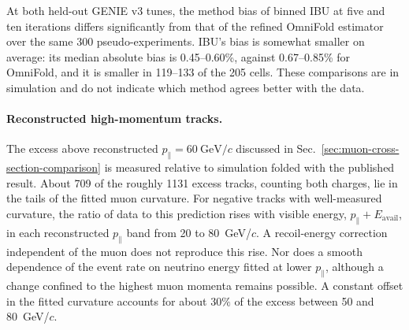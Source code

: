 At both held-out GENIE v3 tunes, the method bias of binned IBU at five and ten iterations differs significantly from that of the refined OmniFold estimator over the same 300 pseudo-experiments. IBU's bias is somewhat smaller on average: its median absolute bias is 0.45--0.60\%, against 0.67--0.85\% for OmniFold, and it is smaller in 119--133 of the 205 cells. These comparisons are in simulation and do not indicate which method agrees better with the data.

\paragraph{Reconstructed high-momentum tracks.}\label{app:high-pz-tracks} The excess above reconstructed $p_\parallel = 60~\mathrm{GeV}/c$ discussed in Sec.~\ref{sec:muon-cross-section-comparison} is measured relative to simulation folded with the published result. About 709 of the roughly 1131 excess tracks, counting both charges, lie in the tails of the fitted muon curvature. For negative tracks with well-measured curvature, the ratio of data to this prediction rises with visible energy, $p_\parallel + E_{\mathrm{avail}}$, in each reconstructed $p_\parallel$ band from 20 to 80~GeV/$c$. A recoil-energy correction independent of the muon does not reproduce this rise. Nor does a smooth dependence of the event rate on neutrino energy fitted at lower $p_\parallel$, although a change confined to the highest muon momenta remains possible. A constant offset in the fitted curvature accounts for about $30\%$ of the excess between 50 and 80~GeV/$c$.

